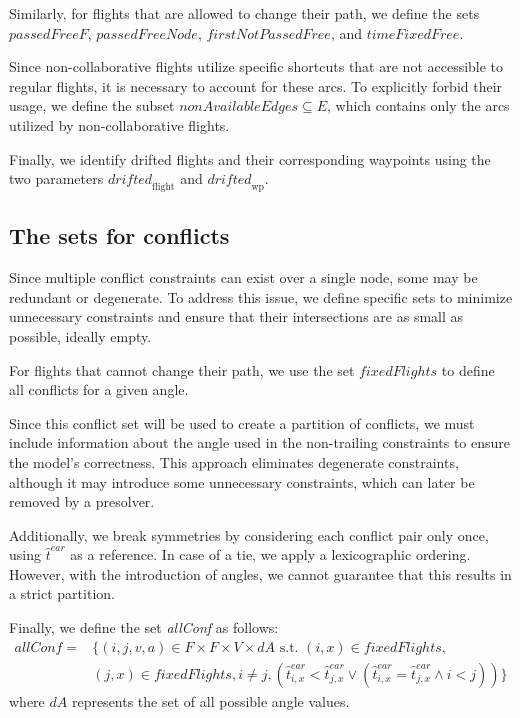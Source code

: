 \documentclass[../thesis.tex]{subfiles}
\begin{document}
Similarly, for flights that are allowed to change their path, we define the sets \( \textit{passedFreeF} \), \( \textit{passedFreeNode} \), \( \textit{firstNotPassedFree} \), and \( \textit{timeFixedFree} \).  

Since non-collaborative flights utilize specific shortcuts that are not accessible to regular flights, it is necessary to account for these arcs. 
To explicitly forbid their usage, we define the subset \( nonAvailableEdges \subseteq E \), which contains only the arcs utilized by non-collaborative flights.


Finally, we identify drifted flights and their corresponding waypoints using the two parameters \( \textit{drifted}_{\text{flight}} \) and \( \textit{drifted}_{\text{wp}} \).  


\subsection{The sets for conflicts}\label{sec:setConflict}

Since multiple conflict constraints can exist over a single node, some may be redundant or degenerate. To address this issue, we define specific sets to minimize unnecessary constraints and ensure that their intersections are as small as possible, ideally empty.

For flights that cannot change their path, we use the set $fixedFlights$ to define all conflicts for a given angle.

Since this conflict set will be used to create a partition of conflicts, we must include information about the angle used in the non-trailing constraints to ensure the model's correctness. This approach eliminates degenerate constraints, although it may introduce some unnecessary constraints, which can later be removed by a presolver.

Additionally, we break symmetries by considering each conflict pair only once, using $\hat{t}^{ear}$ as a reference. In case of a tie, we apply a lexicographic ordering. However, with the introduction of angles, we cannot guarantee that this results in a strict partition.

Finally, we define the set \textit{allConf} as follows:
\begin{align}\label{eq:set:allConf}
    allConf = &\{(i,j,v,a) \in F\times F\times V\times dA \text{ s.t. }  
    (i,x) \in fixedFlights,\nonumber\\& (j,x) \in fixedFlights, i\neq j,  
    (\hat{t}^{ear}_{i,x} < \hat{t}^{ear}_{j,x} \lor (\hat{t}^{ear}_{i,x} = \hat{t}^{ear}_{j,x} \land i<j)) \}
\end{align}
where $dA$ represents the set of all possible angle values.
\end{document}
